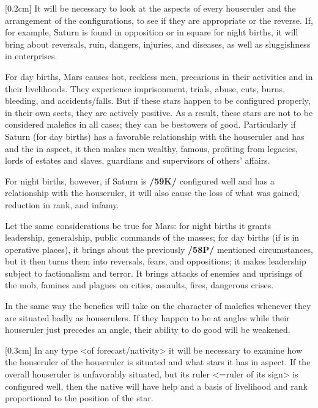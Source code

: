 [0.2cm]
It will be necessary to look at the aspects of every houseruler and the arrangement of the configurations,
to see if they are appropriate or the reverse. If, for example, Saturn is found in opposition or in square for night births, it will bring about reversals, ruin, dangers, injuries, and diseases, as well as sluggishness in
enterprises. 

For day births, Mars causes hot, reckless men, precarious in their activities and in their livelihoods. They experience imprisonment, trials, abuse, cuts, burns, bleeding, and accidents/falls. But \mnmb if these stars happen to be configured properly, in their own sects, they are actively positive. As a result, these stars are not to be considered malefics in all cases; they can be bestowers of good. Particularly if Saturn (for day births) has a favorable relationship with the houseruler and has \Jupiter\xspace and the \Sun\xspace in aspect, it then makes men wealthy, famous, profiting from legacies, lords of estates and slaves, guardians and supervisors of others' affairs. 

For night births, however, if Saturn is \textbf{/59K/} configured well and has a relationship with the houseruler, it will also cause the loss of what was gained, reduction in rank, and infamy. 

Let the same considerations be true for Mars: for night births it grants leadership, generalship, public commands of the masses; for day births (if \Mars\xspace is in operative places), it brings about the previously \textbf{/58P/} mentioned circumstances, but it then turns them into reversals, fears, and oppositions; it makes leadership subject to factionalism and terror. It brings attacks of enemies and uprisings of the mob, famines and plagues on cities, assaults, fires, dangerous crises.

\mnbm[0.2cm]
In the same way the benefics will take on the character of malefics whenever they are situated badly as houserulers. If they happen to be at angles while their houseruler just precedes an angle, their ability to do good will be weakened. 

[0.3cm]
In any type <of forecast/nativity> it will be necessary to examine how the houseruler of the houseruler is situated and what stars it has in aspect. If the overall houseruler is
unfavorably situated, but its ruler <=ruler of its sign> is configured well, then the native will have help and
a basis of livelihood and rank proportional to the position of the star.

\newpage